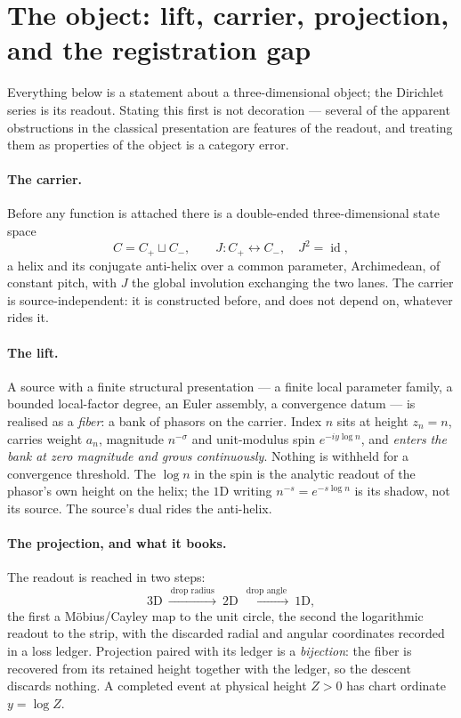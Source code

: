 \documentclass[11pt]{article}
\begin{document}
\section{The object: lift, carrier, projection, and the registration gap}

Everything below is a statement about a three-dimensional object; the Dirichlet series is its
readout. Stating this first is not decoration --- several of the apparent obstructions in the
classical presentation are features of the readout, and treating them as properties of the object
is a category error.

\paragraph{The carrier.} Before any function is attached there is a double-ended
three-dimensional state space
\[
  C=C_+\sqcup C_-,\qquad J:C_+\leftrightarrow C_-,\quad J^2=\operatorname{id},
\]
a helix and its conjugate anti-helix over a common parameter, Archimedean, of constant pitch, with
$J$ the global involution exchanging the two lanes. The carrier is source-independent: it is
constructed before, and does not depend on, whatever rides it.

\paragraph{The lift.} A source with a finite structural presentation --- a finite local parameter
family, a bounded local-factor degree, an Euler assembly, a convergence datum --- is realised as a
\emph{fiber}: a bank of phasors on the carrier. Index $n$ sits at height $z_n=n$, carries weight
$a_n$, magnitude $n^{-\sigma}$ and unit-modulus spin $e^{-iy\log n}$, and \emph{enters the bank at
zero magnitude and grows continuously}. Nothing is withheld for a convergence threshold. The
$\log n$ in the spin is the analytic readout of the phasor's own height on the helix; the $1$D
writing $n^{-s}=e^{-s\log n}$ is its shadow, not its source. The source's dual rides the
anti-helix.

\paragraph{The projection, and what it books.} The readout is reached in two steps:
\[
  3\mathrm D\ \xrightarrow{\ \text{drop radius}\ }\ 2\mathrm D\
    \xrightarrow{\ \text{drop angle}\ }\ 1\mathrm D ,
\]
the first a M\"obius/Cayley map to the unit circle, the second the logarithmic readout to the
strip, with the discarded radial and angular coordinates recorded in a loss ledger. Projection
paired with its ledger is a \emph{bijection}: the fiber is recovered from its retained height
together with the ledger, so the descent discards nothing. A completed event at physical height
$Z>0$ has chart ordinate $y=\log Z$.
\end{document}
